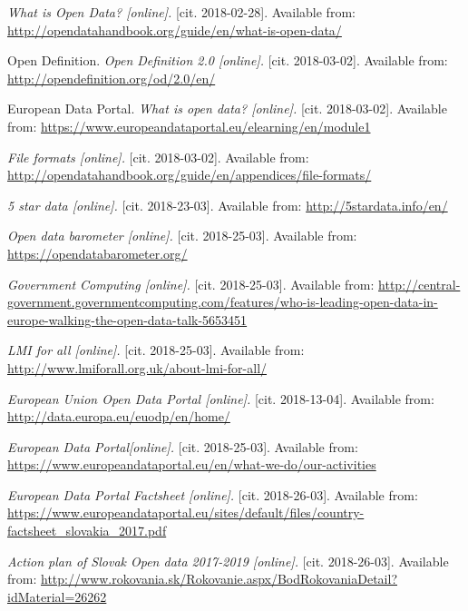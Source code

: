 \documentclass[thesis=B,english]{FITthesis}[2012/06/26]
\begin{document}

\begin{thebibliography}{9}
\textit{What is Open Data? [online].}
[cit. 2018-02-28]. Available from: \url{http://opendatahandbook.org/guide/en/what-is-open-data/} 

Open Definition.
\textit{Open Definition 2.0 [online].}
[cit. 2018-03-02]. Available from: \url{http://opendefinition.org/od/2.0/en/} 

European Data Portal.
\textit{What is open data? [online].}
[cit. 2018-03-02]. Available from: \url{https://www.europeandataportal.eu/elearning/en/module1} 

\textit{File formats [online].}
[cit. 2018-03-02]. Available from: \url{http://opendatahandbook.org/guide/en/appendices/file-formats/} 

\textit{5 star data [online].}
[cit. 2018-23-03]. Available from: \url{http://5stardata.info/en/} 

\textit{Open data barometer [online].}
[cit. 2018-25-03]. Available from: \url{https://opendatabarometer.org/}

\textit{Government Computing [online].}
[cit. 2018-25-03]. Available from: \url{http://central-government.governmentcomputing.com/features/who-is-leading-open-data-in-europe-walking-the-open-data-talk-5653451}

\textit{LMI for all [online].}
[cit. 2018-25-03]. Available from: \url{http://www.lmiforall.org.uk/about-lmi-for-all/}

\textit{European Union Open Data Portal [online].}
[cit. 2018-13-04]. Available from: \url{http://data.europa.eu/euodp/en/home/}

\textit{European Data Portal[online].}
[cit. 2018-25-03]. Available from: \url{https://www.europeandataportal.eu/en/what-we-do/our-activities}

\textit{European Data Portal Factsheet [online].}
[cit. 2018-26-03]. Available from: \url{https://www.europeandataportal.eu/sites/default/files/country-factsheet_slovakia_2017.pdf}

\textit{Action plan of Slovak Open data 2017-2019 [online].}
[cit. 2018-26-03]. Available from: \url{http://www.rokovania.sk/Rokovanie.aspx/BodRokovaniaDetail?idMaterial=26262}


\end{thebibliography}
\end{document}
